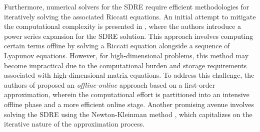 \documentclass{article}
\begin{document}
 Furthermore, numerical solvers for the SDRE require efficient methodologies for iteratively solving the associated Riccati equations. An initial attempt to mitigate the computational complexity is presented in \cite{beeler2000feedback}, where the authors introduce a power series expansion for the SDRE solution. This approach involves computing certain terms offline by solving a Riccati equation alongside a sequence of Lyapunov equations. However, for high-dimensional problems, this method may become impractical due to the computational burden and storage requirements associated with high-dimensional matrix equations. To address this challenge, the authors of \cite{alla2023state} proposed an \emph{offline-online} approach based on a first-order approximation, wherein the computational effort is partitioned into an intensive offline phase and a more efficient online stage. Another promising avenue involves solving the SDRE using the Newton-Kleinman method \cite{kleinman1968,saluzzi2025dynamical}, which capitalizes on the iterative nature of the approximation process.
 
 
\end{document}
